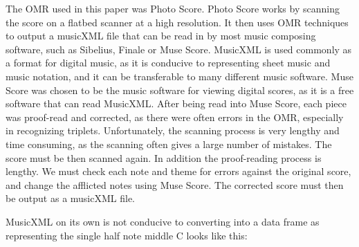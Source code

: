 \documentclass[12pt,twoside]{reedthesis}
\theoremstyle{definition}
\theoremstyle{definition}
\theoremstyle{definition}
\theoremstyle{remark}
\begin{document}
The OMR used in this paper was Photo Score. Photo Score works by
scanning the score on a flatbed scanner at a high resolution. It then
uses OMR techniques to output a musicXML file that can be read in by
most music composing software, such as Sibelius, Finale or Muse Score.
MusicXML is used commonly as a format for digital music, as it is
conducive to representing sheet music and music notation, and it can be
transferable to many different music software. Muse Score was chosen to
be the music software for viewing digital scores, as it is a free
software that can read MusicXML. After being read into Muse Score, each
piece was proof-read and corrected, as there were often errors in the
OMR, especially in recognizing triplets. Unfortunately, the scanning
process is very lengthy and time consuming, as the scanning often gives
a large number of mistakes. The score must be then scanned again. In
addition the proof-reading process is lengthy. We must check each note
and theme for errors against the original score, and change the
afflicted notes using Muse Score. The corrected score must then be
output as a musicXML file.

MusicXML on its own is not conducive to converting into a data frame as
representing the single half note middle C looks like this:
\end{document}
